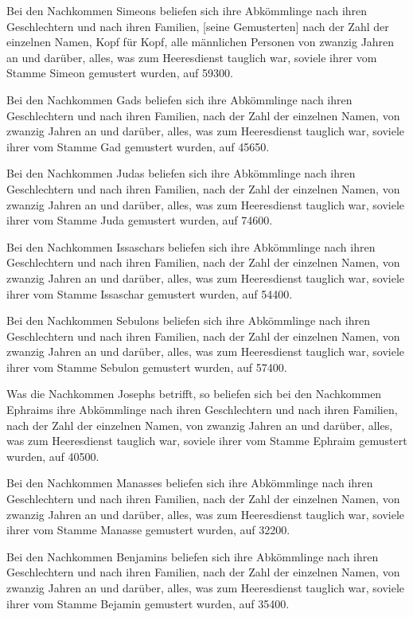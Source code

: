 Bei den Nachkommen Simeons beliefen sich ihre Abkömmlinge
nach ihren Geschlechtern und nach ihren Familien, {[}seine
Gemusterten{]} nach der Zahl der einzelnen Namen, Kopf für Kopf, alle
männlichen Personen von zwanzig Jahren an und darüber, alles, was zum
Heeresdienst tauglich war, soviele ihrer vom Stamme
Simeon gemustert wurden, auf 59300.

Bei den Nachkommen Gads beliefen sich ihre Abkömmlinge
nach ihren Geschlechtern und nach ihren Familien, nach der Zahl der
einzelnen Namen, von zwanzig Jahren an und darüber, alles, was zum
Heeresdienst tauglich war, soviele ihrer vom Stamme Gad
gemustert wurden, auf 45650.

Bei den Nachkommen Judas beliefen sich ihre Abkömmlinge
nach ihren Geschlechtern und nach ihren Familien, nach der Zahl der
einzelnen Namen, von zwanzig Jahren an und darüber, alles, was zum
Heeresdienst tauglich war, soviele ihrer vom Stamme Juda
gemustert wurden, auf 74600.

Bei den Nachkommen Issaschars beliefen sich ihre
Abkömmlinge nach ihren Geschlechtern und nach ihren Familien, nach der
Zahl der einzelnen Namen, von zwanzig Jahren an und darüber, alles, was
zum Heeresdienst tauglich war, soviele ihrer vom Stamme
Issaschar gemustert wurden, auf 54400.

Bei den Nachkommen Sebulons beliefen sich ihre
Abkömmlinge nach ihren Geschlechtern und nach ihren Familien, nach der
Zahl der einzelnen Namen, von zwanzig Jahren an und darüber, alles, was
zum Heeresdienst tauglich war, soviele ihrer vom Stamme
Sebulon gemustert wurden, auf 57400.

Was die Nachkommen Josephs betrifft, so beliefen sich bei
den Nachkommen Ephraims ihre Abkömmlinge nach ihren Geschlechtern und
nach ihren Familien, nach der Zahl der einzelnen Namen, von zwanzig
Jahren an und darüber, alles, was zum Heeresdienst tauglich war,
soviele ihrer vom Stamme Ephraim gemustert wurden, auf
40500.

Bei den Nachkommen Manasses beliefen sich ihre
Abkömmlinge nach ihren Geschlechtern und nach ihren Familien, nach der
Zahl der einzelnen Namen, von zwanzig Jahren an und darüber, alles, was
zum Heeresdienst tauglich war, soviele ihrer vom Stamme
Manasse gemustert wurden, auf 32200.

Bei den Nachkommen Benjamins beliefen sich ihre
Abkömmlinge nach ihren Geschlechtern und nach ihren Familien, nach der
Zahl der einzelnen Namen, von zwanzig Jahren an und darüber, alles, was
zum Heeresdienst tauglich war, soviele ihrer vom Stamme
Bejamin gemustert wurden, auf 35400.

